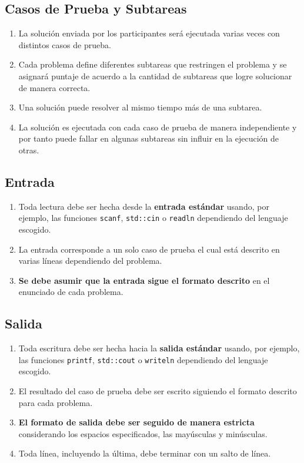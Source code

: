 \documentclass[12pt]{oci}
\begin{document}
\subsection*{Casos de Prueba y Subtareas}
\begin{enumerate}
\itemsep 0em
\item La soluci\'on enviada por los participantes ser\'a ejecutada varias veces con distintos casos de prueba.
\item Cada problema define diferentes subtareas que restringen el problema y se asignar\'a puntaje de acuerdo a la cantidad de subtareas que logre solucionar de manera correcta.
\item Una soluci\'on puede resolver al mismo tiempo m\'as de una subtarea.
\item La soluci\'on es ejecutada con cada caso de prueba de manera independiente y por tanto puede fallar en algunas subtareas sin influir en la ejecuci\'on de otras.
\end{enumerate}

\subsection*{Entrada}
\begin{enumerate}
\itemsep 0em
\item Toda lectura debe ser hecha desde la {\bf entrada est\'andar} usando, por ejemplo, las funciones \verb+scanf+, \verb+std::cin+ o \verb+readln+ dependiendo del lenguaje escogido.
\item La entrada corresponde a un solo caso de prueba el cual est\'a descrito en varias l\'ineas dependiendo del problema.
\item {\bf Se debe asumir que la entrada sigue el formato descrito} en el enunciado de cada problema.
\end{enumerate}

\subsection*{Salida}
\begin{enumerate}
\itemsep 0em
\item Toda escritura debe ser hecha hacia la {\bf salida est\'andar} usando, por ejemplo, las funciones \verb+printf+, \verb+std::cout+ o \verb+writeln+ dependiendo del lenguaje escogido.
\item El resultado del caso de prueba debe ser escrito siguiendo el formato descrito para cada problema.
\item {\bf El formato de salida debe ser seguido de manera estricta} considerando los espacios especificados, las may\'usculas y min\'usculas.
\item Toda l\'inea, incluyendo la \'ultima, debe terminar con un salto de l\'inea.
\end{enumerate}
\end{document}
